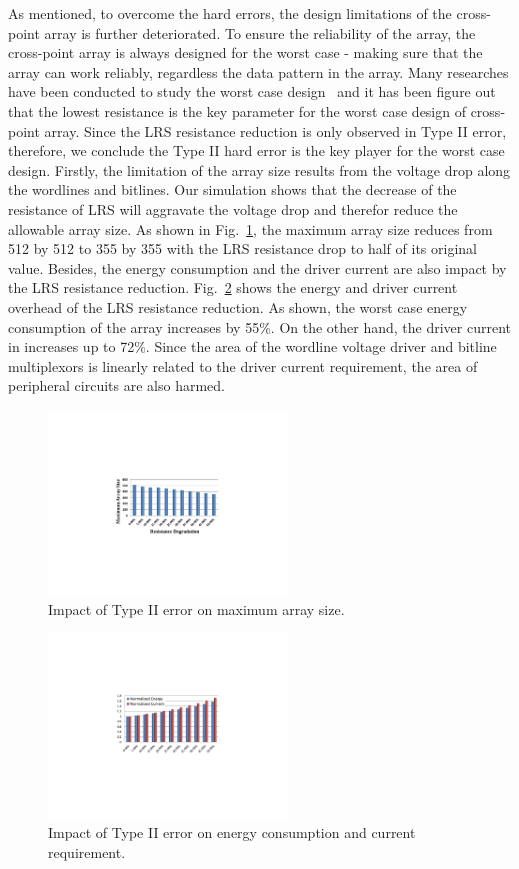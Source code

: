 As mentioned, to overcome the hard errors, the design limitations of the cross-point array is further deteriorated. To ensure the reliability of the array, the cross-point array is always designed for the worst case - making sure that the array can work reliably, regardless the data pattern in the array. Many researches have been conducted to study the worst case design~\cite{jiale, Dimin_ISLPED} and it has been figure out that the lowest resistance is the key parameter for the worst case design of cross-point array. Since the LRS resistance reduction is only observed in Type II error, therefore, we conclude the Type II hard error is the key player for the worst case design. Firstly, the limitation of the array size results from the voltage drop along the wordlines and bitlines. Our simulation shows that the decrease of the resistance of LRS will aggravate the voltage drop and therefor reduce the allowable array size. As shown in Fig.~\ref{fig:size}, the maximum array size reduces from 512 by 512 to 355 by 355 with the LRS resistance drop to half of its original value. Besides, the energy consumption and the driver current are also impact by the LRS resistance reduction. Fig.~\ref{fig:EC} shows the energy and driver current overhead of the LRS resistance reduction. As shown, the worst case energy consumption of the array increases by 55\%. On the other hand, the driver current in increases up to 72\%. Since the area of the wordline voltage driver and bitline multiplexors is linearly related to the driver current requirement, the area of peripheral circuits are also harmed.



\begin{figure}[!t]
\centering
    \includegraphics[width=2.5in]{./fig/size.pdf}
\caption{Impact of Type II error on maximum array size.}
\label{fig:size}
\end{figure}

\begin{figure}[!t]
\centering
    \includegraphics[width=2.5in]{./fig/EC.pdf}
\caption{Impact of Type II error on energy consumption and current requirement.}
\label{fig:EC}
\end{figure}
